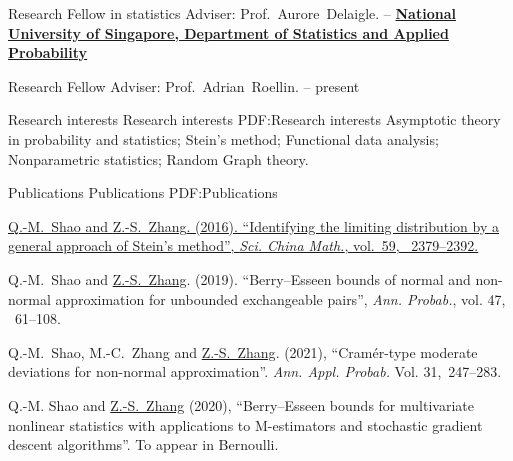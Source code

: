 \documentclass[letterpaper,MMMyyyy,nonstopmode]{simpleresumecv}
\begin{document}
\begin{Body}
\Gap
\BulletItem
Research Fellow in statistics
\SubBulletItem
Adviser:
Prof.~Aurore~Delaigle.
\hfill
{} --
\Gap 
\Entry
\href{http://www.nus.edu.sg}
{\textbf{National University of Singapore,  Department of Statistics and Applied Probability}}

\BulletItem
Research Fellow
\SubBulletItem
Adviser:
Prof.~Adrian~Roellin.
\hfill
{} --
present
\begin{Detail}

\end{Detail}



\Section
{Research interests}
{Research interests}
{PDF:Research interests}
Asymptotic theory in probability and statistics;  Stein's method;  Functional data analysis;
Nonparametric statistics; Random Graph theory.


\Section
{Publications}
{Publications}
{PDF:Publications}


\begingroup
\renewcommand{\MaxNumberedItem}{[88]}

\BigGap
\NumberedItem{[1]}
\href{http://link.springer.com/article/10.1007/s11425-016-0322-3}
{Q.-M.~Shao and \underline{Z.-S.~Zhang}.  (2016).
``Identifying the limiting distribution by a general approach of Stein’s method'',
\textit{Sci. China Math.},
vol.~59,
~2379--2392. } 

\BigGap
\NumberedItem{[2]}
{Q.-M.~Shao and \underline{Z.-S.~Zhang}. (2019).
``Berry--Esseen bounds of normal and non-normal approximation for unbounded exchangeable pairs'',
\textit{Ann. Probab.}, 
vol. 47, 
~61--108. }

\BigGap
\NumberedItem{[3]}
{Q.-M.~Shao, M.-C.~Zhang and {\underline{Z.-S.~Zhang}}. (2021),
``Cram\'er-type moderate deviations for non-normal
approximation''. \textit{Ann. Appl. Probab.}
Vol. 31,~247–283.}
 

\NumberedItem{[4]}
Q.-M. Shao and \underline{Z.-S.~Zhang} (2020),
``Berry–Esseen bounds for multivariate nonlinear statistics with applications to M-estimators and stochastic gradient descent algorithms''.
To appear in Bernoulli. 
\endgroup



\end{Body}
\end{document}
